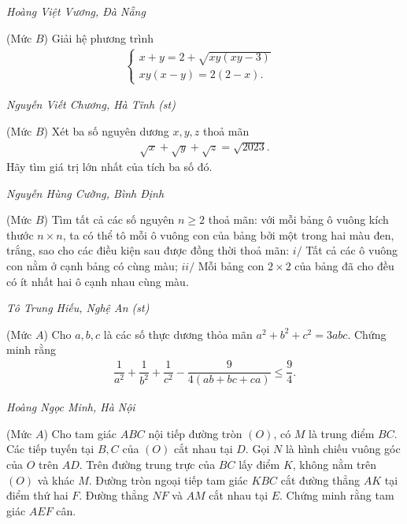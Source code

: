 \begin{multicols}{2}
\begin{flushright}
		\textit{Hoàng Việt Vương, Đà Nẵng}
	\end{flushright}
	{}
	(Mức $B$) Giải hệ phương trình 
	\begin{align*}
		\begin{cases}
			x+y=2+\sqrt{xy(xy-3)}&\\
			xy(x-y)=2(2-x).
		\end{cases}
	\end{align*}
	\begin{flushright}
		\textit{Nguyễn Viết Chương, Hà Tĩnh (st)}
	\end{flushright}
	{}
	(Mức $B$) Xét ba số nguyên dương $x,y,z$ thoả mãn
	\begin{align*}
		\sqrt x+\sqrt y+\sqrt z=\sqrt{2023}.
	\end{align*}
	Hãy tìm giá trị lớn nhất của tích ba số đó.
	\begin{flushright}
		\textit{Nguyễn Hùng Cường, Bình Định}
	\end{flushright}
	{}
	(Mức $B$) Tìm tất cả các số nguyên $n\ge2$ thoả mãn: với mỗi bảng ô vuông kích thước $n\times n$,  ta có thể tô mỗi ô vuông con của bảng bởi một trong hai màu đen, trắng, sao cho các điều kiện sau được đồng thời thoả mãn:  
	\vskip 0.05cm
	$i/$ Tất cả các  ô vuông con nằm ở cạnh bảng có cùng màu;
	\vskip 0.05cm
	$ii/$ Mỗi bảng con $2\times 2$ của bảng đã cho đều có ít nhất hai ô cạnh nhau cùng màu.
	\begin{flushright}
		\textit{Tô Trung Hiếu, Nghệ An (st)}
	\end{flushright}
	{}
	(Mức $A$) Cho $a,b,c$ là các số thực dương thỏa mãn $a^2+b^2+c^2=3abc$. Chứng minh rằng
	\begin{align*}
		\dfrac{1}{a^2}+\dfrac{1}{b^2}+\dfrac{1}{c^2}-\dfrac{9}{4(ab+bc+ca)}\le \dfrac94.
	\end{align*}
	\begin{flushright}
		\textit{Hoàng Ngọc Minh, Hà Nội}
	\end{flushright}
	{}
	(Mức $A$) Cho tam giác $ABC$ nội tiếp đường tròn $(O)$, có $M$ là trung điểm $BC$. Các tiếp tuyến tại $B,C$ của $(O)$ cắt nhau tại $D$. Gọi $N$ là hình chiếu vuông góc của $O$ trên $AD$. Trên đường trung trực của $BC$ lấy điểm $K$, không nằm trên $(O)$ và khác $M$. Đường tròn ngoại tiếp tam giác $KBC$ cắt đường thẳng $AK$ tại điểm thứ hai $F$. Đường thẳng $NF$ và $AM$ cắt nhau tại $E$. Chứng minh rằng tam giác $AEF$ cân.

\end{multicols}
